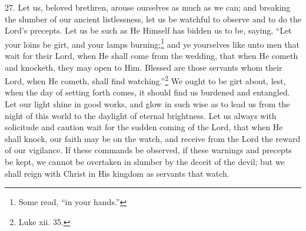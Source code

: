 27. Let us, beloved brethren, arouse ourselves as much as we can; and breaking the slumber of our ancient listlessness, let us be watchful to observe and to do the Lord’s precepts. Let us be such as He Himself has bidden us to be, saying, “Let your loins be girt, and your lamps burning;\footnote{Some read, “in your hands.”} and ye yourselves like unto men that wait for their Lord, when He shall come from the wedding, that when He cometh and knocketh, they may open to Him. Blessed are those servants whom their Lord, when He cometh, shall find watching.”\footnote{Luke xii. 35.} We ought to be girt about, lest, when the day of setting forth comes, it should find us burdened and entangled. Let our light shine in good works, and glow in such wise as to lead us from the night of this world to the daylight of eternal brightness. Let us always with solicitude and caution wait for the sudden coming of the Lord, that when He shall knock, our faith may be on the watch, and receive from the Lord the reward of our vigilance. If these commands be observed, if these warnings and precepts be kept, we cannot be overtaken in slumber by the deceit of the devil; but we shall reign with Christ in His kingdom as servants that watch.
